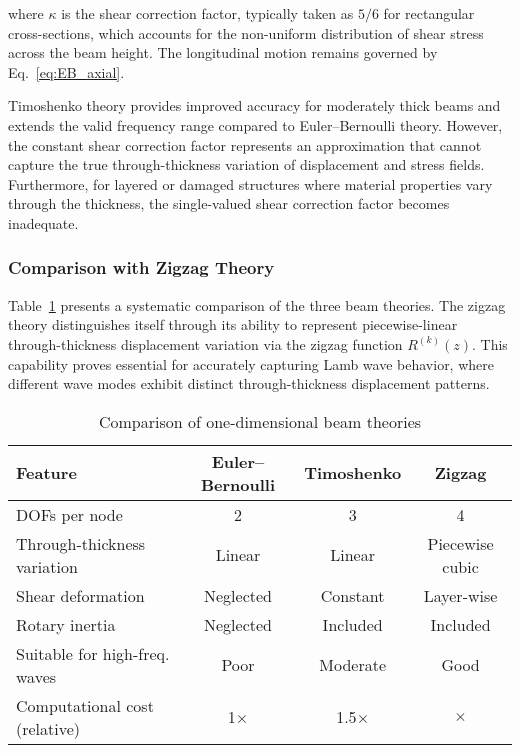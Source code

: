 \documentclass[12pt,a4paper]{report}
\begin{document}
where $\kappa$ is the shear correction factor, typically taken as $5/6$ for rectangular cross-sections, which accounts for the non-uniform distribution of shear stress across the beam height. The longitudinal motion remains governed by Eq.~\eqref{eq:EB_axial}.

Timoshenko theory provides improved accuracy for moderately thick beams and extends the valid frequency range compared to Euler--Bernoulli theory. However, the constant shear correction factor represents an approximation that cannot capture the true through-thickness variation of displacement and stress fields. Furthermore, for layered or damaged structures where material properties vary through the thickness, the single-valued shear correction factor becomes inadequate.

\subsubsection{Comparison with Zigzag Theory}

Table~\ref{tab:theory_comparison} presents a systematic comparison of the three beam theories. The zigzag theory distinguishes itself through its ability to represent piecewise-linear through-thickness displacement variation via the zigzag function $R^{(k)}(z)$. This capability proves essential for accurately capturing Lamb wave behavior, where different wave modes exhibit distinct through-thickness displacement patterns.

\begin{table}[h]
\centering
\caption{Comparison of one-dimensional beam theories}
\label{tab:theory_comparison}
\begin{tabular}{lccc}
\toprule
\textbf{Feature} & \textbf{Euler--Bernoulli} & \textbf{Timoshenko} & \textbf{Zigzag} \\
\midrule
DOFs per node & 2 & 3 & 4 \\
Through-thickness variation & Linear & Linear & Piecewise cubic \\
Shear deformation & Neglected & Constant & Layer-wise \\
Rotary inertia & Neglected & Included & Included \\
Suitable for high-freq. waves & Poor & Moderate & Good \\
Computational cost (relative) & 1$\times$ & 1.5$\times$ & \approx 1.5$\times$ \\
\bottomrule
\end{tabular}
\end{table}
\end{document}
